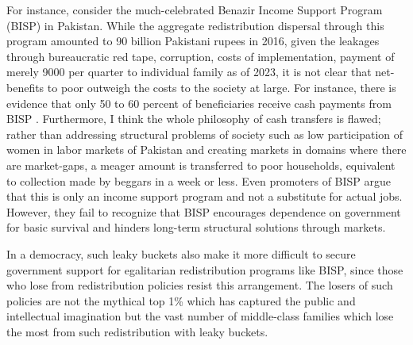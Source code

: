 \documentclass[12pt]{article}
\newcommand{\1}{\mathbbm 1}
\begin{document}
		 For instance, consider the much-celebrated Benazir Income Support Program (BISP) in Pakistan. While the aggregate redistribution dispersal through this program amounted to 90 billion Pakistani rupees in 2016, given the leakages through bureaucratic red tape, corruption, costs of implementation, payment of merely 9000 per quarter to individual family as of 2023, it is not clear that net-benefits to poor outweigh the costs to the society at large. For instance, there is evidence that only 50 to 60 percent of beneficiaries receive cash payments from BISP \cite{ahmad2018}. Furthermore, I think the whole philosophy of cash transfers is flawed; rather than addressing structural problems of society such as low participation of women in labor markets of Pakistan and creating markets in domains where there are market-gaps, a meager amount is transferred to poor households, equivalent to collection made by beggars in a week or less. Even promoters of BISP argue that this is only an income support program and not a substitute for actual jobs. However, they fail to recognize that BISP encourages dependence on government for basic survival and hinders long-term structural solutions through markets.
		 
		 
		 
		
		
		In a democracy, such leaky buckets also make it more difficult to secure government support for egalitarian redistribution programs like BISP, since those who lose from redistribution policies resist this arrangement. The losers of such policies are not the mythical top 1\% which has captured the public and intellectual imagination but the vast number of middle-class families which lose the most from such redistribution with leaky buckets.
		
		
\end{document}
